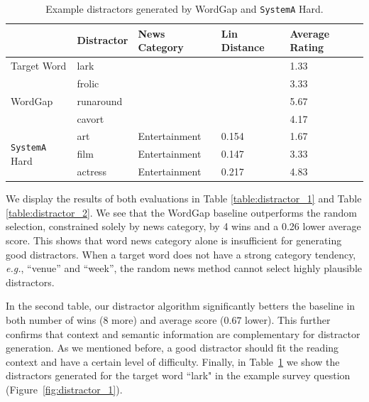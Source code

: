 \begin{table}[ht]
\caption{Example distractors generated by WordGap and {\tt SystemA} Hard.} 
\label{table:example_distractors}
\centering
\begin{tabular}{|l|l|l|l|l|}
\hline
                              & {\bf Distractor} & {\bf News Category} & {\bf Lin Distance} & {\bf Average Rating} \\ \hline
Target Word                   & lark       &               &              & 1.33       \\ \hline
\multirow{3}{*}{WordGap}      & frolic     &               &              & 3.33       \\ \cline{2-5} 
                              & runaround  &               &              & 5.67       \\ \cline{2-5} 
                              & cavort     &               &              & 4.17       \\ \hline
\multirow{3}{*}{{\tt SystemA} Hard} & art        & Entertainment & 0.154        & 1.67       \\ \cline{2-5} 
                              & film       & Entertainment & 0.147        & 3.33       \\ \cline{2-5} 
                              & actress    & Entertainment & 0.217        & 4.83       \\ \hline
\end{tabular}
\end{table}

We display the results of both evaluations in Table
\ref{table:distractor_1} and Table \ref{table:distractor_2}.  We see
that the WordGap baseline outperforms the random selection,
constrained solely by news category, by 4 wins and a 0.26 lower
average score.  This shows that word news category alone is
insufficient for generating good distractors.  When a target word does
not have a strong category tendency, {\it e.g.}, ``venue'' and
``week'', the random news method cannot select highly plausible
distractors. 

In the second table, our distractor algorithm significantly betters
the baseline in both number of wins (8 more) and average score ($0.67$
lower).  This further confirms that context and semantic information
are complementary for distractor generation. As we mentioned before, a
good distractor should fit the reading context and have a certain
level of difficulty.
Finally, in Table~\ref{table:example_distractors} we show the distractors generated for the target word “lark" in the example survey question (Figure~\ref{fig:distractor_1}).



